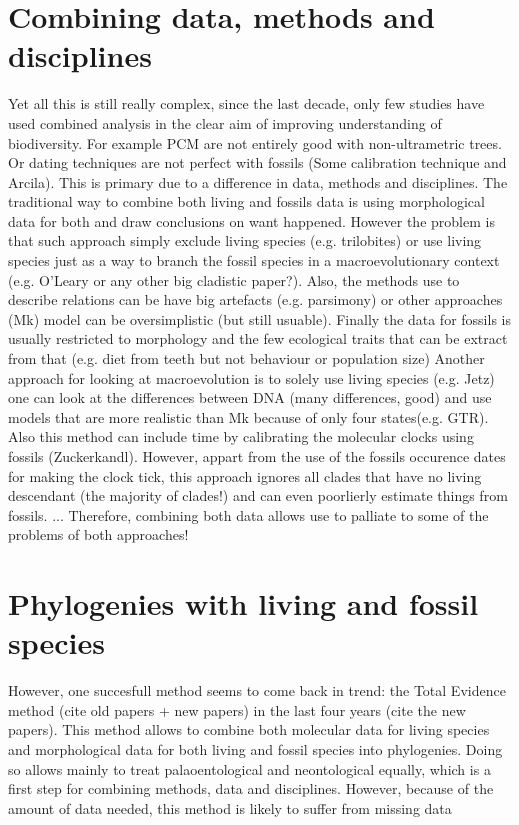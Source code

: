 \section{Combining data, methods and disciplines}
Yet all this is still really complex, since the last decade, only few studies have used combined analysis in the clear aim of improving understanding of biodiversity.
For example PCM are not entirely good with non-ultrametric trees.
Or dating techniques are not perfect with fossils (Some calibration technique and Arcila).
This is primary due to a difference in data, methods and disciplines.
The traditional way to combine both living and fossils data is using morphological data for both and draw conclusions on want happened.
However the problem is that such approach simply exclude living species (e.g. trilobites) or use living species just as a way to branch the fossil species in a macroevolutionary context (e.g. O'Leary or any other big cladistic paper?).
Also, the methods use to describe relations can be have big artefacts (e.g. parsimony) or other approaches (Mk) model can be oversimplistic (but still usuable).
Finally the data for fossils is usually restricted to morphology and the few ecological traits that can be extract from that (e.g. diet from teeth but not behaviour or population size)
Another approach for looking at macroevolution is to solely use living species (e.g. Jetz) one can look at the differences between DNA (many differences, good) and use models that are more realistic than Mk because of only four states(e.g. GTR).
Also this method can include time by calibrating the molecular clocks using fossils (Zuckerkandl).
However, appart from the use of the fossils occurence dates for making the clock tick, this approach ignores all clades that have no living descendant (the majority of clades!) and can even poorlierly estimate things from fossils.
...
Therefore, combining both data allows use to palliate to some of the problems of both approaches!

\section{Phylogenies with living and fossil species}
However, one succesfull method seems to come back in trend: the Total Evidence method (cite old papers + new papers) in the last four years (cite the new papers).
This method allows to combine both molecular data for living species and morphological data for both living and fossil species into phylogenies.
Doing so allows mainly to treat palaoentological and neontological equally, which is a first step for combining methods, data and disciplines.
However, because of the amount of data needed, this method is likely to suffer from missing data

